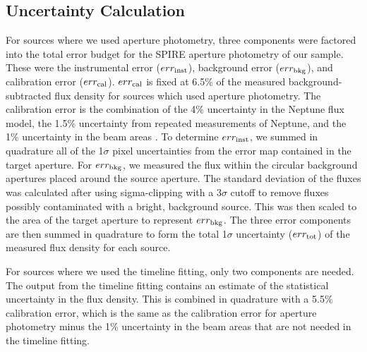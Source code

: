 \subsection{Uncertainty Calculation}
For sources where we used aperture photometry, three components were factored into the total error budget for the SPIRE aperture photometry of our sample. These were the instrumental error ($err_{\rm{inst}}$), background error ($err_{\rm{bkg}}$), and calibration error ($err_{\rm{cal}}$). $err_{\rm{cal}}$ is fixed at 6.5\% of the measured background-subtracted flux density for sources which used aperture photometry. The calibration error is the combination of the 4\% uncertainty in the Neptune flux model, the 1.5\% uncertainty from repeated measurements of Neptune, and the 1\% uncertainty in the beam areas \citep{Bendo:2013sd}. To determine $err_{\rm{inst}}$, we summed in quadrature all of the 1$\sigma$ pixel uncertainties from the error map contained in the target aperture. For $err_{\rm{bkg}}$, we measured the flux within the circular background apertures placed around the source aperture. The standard deviation of the fluxes was calculated after using sigma-clipping with a 3$\sigma$ cutoff to remove fluxes possibly contaminated with a bright, background source.  This was then scaled to the area of the target aperture to represent $err_{\rm{bkg}}$.  The three error components are then summed in quadrature to form the total 1$\sigma$ uncertainty ($err_{\rm{tot}}$) of the measured flux density for each source.

For sources where we used the timeline fitting, only two components are needed. The output from the timeline fitting contains an estimate of the statistical uncertainty in the flux density. This is combined in quadrature with a 5.5\% calibration error, which is the same as the calibration error for aperture photometry minus the 1\% uncertainty in the beam areas that are not needed in the timeline fitting.
  